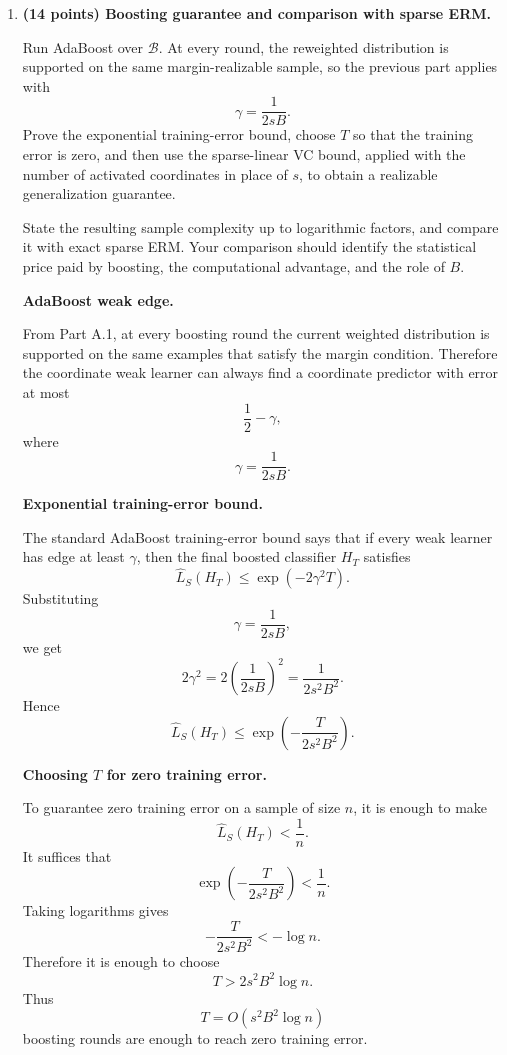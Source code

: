\documentclass[11pt]{article}
\begin{document}
\begin{enumerate}
    \item \textbf{(14 points) Boosting guarantee and comparison with sparse ERM.}

    Run AdaBoost over $\mathcal B$. At every round, the reweighted distribution is supported on the same margin-realizable sample, so the previous part applies with
    \[
    \gamma=\frac{1}{2sB}.
    \]
    Prove the exponential training-error bound, choose $T$ so that the training error is zero, and then use the sparse-linear VC bound, applied with the number of activated coordinates in place of $s$, to obtain a realizable generalization guarantee.

    State the resulting sample complexity up to logarithmic factors, and compare it with exact sparse ERM. Your comparison should identify the statistical price paid by boosting, the computational advantage, and the role of $B$.

    \begin{solutionbox}
    \textbf{AdaBoost weak edge.}

    From Part A.1, at every boosting round the current weighted distribution is supported on the
    same examples that satisfy the margin condition. Therefore the coordinate weak learner can
    always find a coordinate predictor with error at most
    \[
    \frac12-\gamma,
    \]
    where
    \[
    \gamma=\frac{1}{2sB}.
    \]

    \medskip

    \textbf{Exponential training-error bound.}

    The standard AdaBoost training-error bound says that if every weak learner has edge at least
    $\gamma$, then the final boosted classifier $H_T$ satisfies
    \[
    \widehat L_S(H_T)
    \le
    \exp(-2\gamma^2T).
    \]
    Substituting
    \[
    \gamma=\frac{1}{2sB},
    \]
    we get
    \[
    2\gamma^2
    =
    2\left(\frac{1}{2sB}\right)^2
    =
    \frac{1}{2s^2B^2}.
    \]
    Hence
    \[
    \boxed{
    \widehat L_S(H_T)
    \le
    \exp\left(-\frac{T}{2s^2B^2}\right).
    }
    \]

    \medskip

    \textbf{Choosing $T$ for zero training error.}

    To guarantee zero training error on a sample of size $n$, it is enough to make
    \[
    \widehat L_S(H_T)<\frac1n.
    \]
    It suffices that
    \[
    \exp\left(-\frac{T}{2s^2B^2}\right)<\frac1n.
    \]
    Taking logarithms gives
    \[
    -\frac{T}{2s^2B^2}<-\log n.
    \]
    Therefore it is enough to choose
    \[
    T>2s^2B^2\log n.
    \]
    Thus
    \[
    \boxed{
    T=O(s^2B^2\log n)
    }
    \]
    boosting rounds are enough to reach zero training error.


\end{solutionbox}
\end{enumerate}
\end{document}
